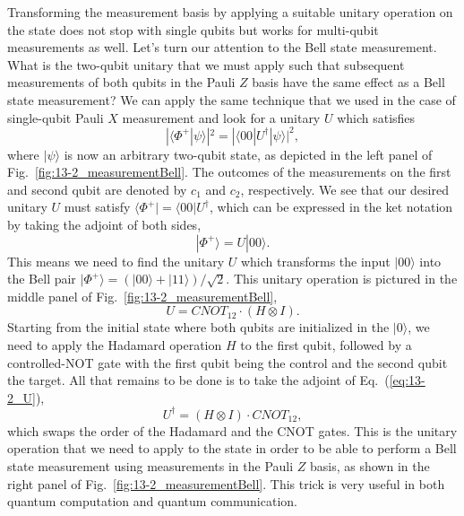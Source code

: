 Transforming the measurement basis by applying a suitable unitary operation on the state does not stop with single qubits but works for multi-qubit measurements as well.
Let's turn our attention to the Bell state measurement.
What is the two-qubit unitary that we must apply such that subsequent measurements of both qubits in the Pauli $Z$ basis have the same effect as a Bell state measurement?
We can apply the same technique that we used in the case of single-qubit Pauli $X$ measurement and look for a unitary $U$ which satisfies
\begin{equation}
    |\langle\Phi^+|\psi\rangle|^2 = |\langle00|U^{\dagger}|\psi\rangle|^2,
\end{equation}
where $|\psi\rangle$ is now an arbitrary two-qubit state, as depicted in the left panel of Fig.~\ref{fig:13-2_measurementBell}.
The outcomes of the measurements on the first and second qubit are denoted by $c_1$ and $c_2$, respectively.
We see that our desired unitary $U$ must satisfy $\langle\Phi^+| = \langle00|U^{\dagger}$, which can be expressed in the ket notation by taking the adjoint of both sides,
\begin{equation}
    |\Phi^+\rangle = U |00\rangle.
    \label{eq:string_to_bell}
\end{equation}
This means we need to find the unitary $U$ which transforms the input $|00\rangle$ into the Bell pair $|\Phi^+\rangle = (|00\rangle + |11\rangle) / \sqrt{2}$.
This unitary operation is pictured in the middle panel of Fig.~\ref{fig:13-2_measurementBell},
\begin{equation}
    U = CNOT_{12} \cdot (H \otimes I).
    \label{eq:13-2_U}
\end{equation}
Starting from the initial state where both qubits are initialized in the $|0\rangle$, we need to apply the Hadamard operation $H$ to the first qubit, followed by a controlled-NOT gate with the first qubit being the control and the second qubit the target.
All that remains to be done is to take the adjoint of Eq.~(\ref{eq:13-2_U}),
\begin{equation}
    U^{\dagger} = (H \otimes I) \cdot CNOT_{12},
\end{equation}
which swaps the order of the Hadamard and the CNOT gates.
This is the unitary operation that we need to apply to the state \ket{\psi} in order to be able to perform a Bell state measurement using measurements in the Pauli $Z$ basis, as shown in the right panel of Fig.~\ref{fig:13-2_measurementBell}.
This trick is very useful in both quantum computation and quantum communication.

